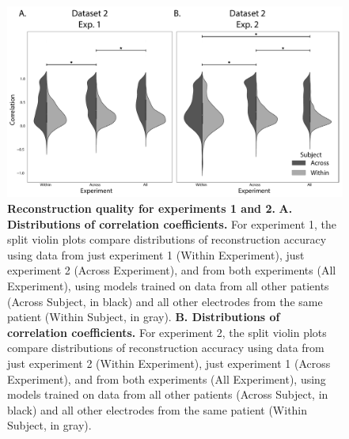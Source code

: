 \documentclass{article}
\begin{document}
\begin{figure}[p!]
\centering
\includegraphics[width=\textwidth]{figs/supplemental_2}
\caption{\small \textbf{Reconstruction quality for experiments 1 and 2.} \textbf{A. Distributions
      of correlation coefficients.} For experiment 1, the split violin plots compare distributions of reconstruction accuracy using data from just experiment 1 (Within Experiment), just experiment 2 (Across Experiment), and from both experiments (All Experiment), using models trained on data from all other patients (Across Subject, in black) and all other electrodes from the same patient (Within Subject, in gray). \textbf{B.  Distributions
      of correlation coefficients.} For experiment 2, the split violin plots compare distributions of reconstruction accuracy using data from just experiment 2 (Within Experiment), just experiment 1 (Across Experiment), and from both experiments (All Experiment), using models trained on data from all other patients (Across Subject, in black) and all other electrodes from the same patient (Within Subject, in gray). }
\label{fig:supplemental_2}
\end{figure}
\end{document}
